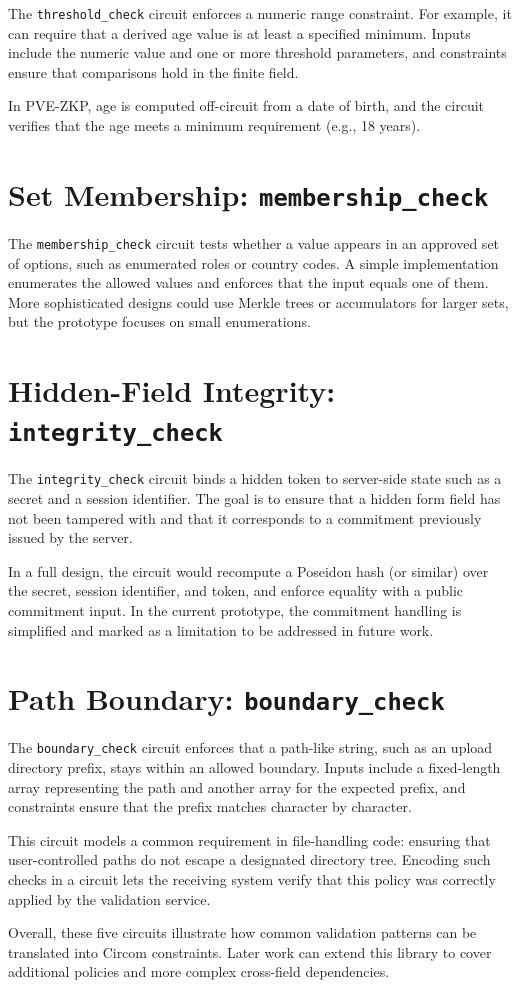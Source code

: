 The \texttt{threshold\_check} circuit enforces a numeric range constraint. For
example, it can require that a derived age value is at least a specified
minimum. Inputs include the numeric value and one or more threshold parameters,
and constraints ensure that comparisons hold in the finite field.

In PVE-ZKP, age is computed off-circuit from a date of birth, and the circuit
verifies that the age meets a minimum requirement (e.g., 18 years).

\section{Set Membership: \texttt{membership\_check}}

The \texttt{membership\_check} circuit tests whether a value appears in an
approved set of options, such as enumerated roles or country codes. A simple
implementation enumerates the allowed values and enforces that the input equals
one of them. More sophisticated designs could use Merkle trees or accumulators
for larger sets, but the prototype focuses on small enumerations.

\section{Hidden-Field Integrity: \texttt{integrity\_check}}

The \texttt{integrity\_check} circuit binds a hidden token to server-side state
such as a secret and a session identifier. The goal is to ensure that a hidden
form field has not been tampered with and that it corresponds to a commitment
previously issued by the server.

In a full design, the circuit would recompute a Poseidon hash (or similar)
over the secret, session identifier, and token, and enforce equality with a
public commitment input. In the current prototype, the commitment handling is
simplified and marked as a limitation to be addressed in future work.

\section{Path Boundary: \texttt{boundary\_check}}

The \texttt{boundary\_check} circuit enforces that a path-like string, such as
an upload directory prefix, stays within an allowed boundary. Inputs include a
fixed-length array representing the path and another array for the expected
prefix, and constraints ensure that the prefix matches character by character.

This circuit models a common requirement in file-handling code: ensuring that
user-controlled paths do not escape a designated directory tree. Encoding such
checks in a circuit lets the receiving system verify that this policy was
correctly applied by the validation service.

Overall, these five circuits illustrate how common validation patterns can be
translated into Circom constraints. Later work can extend this library to cover
additional policies and more complex cross-field dependencies.
